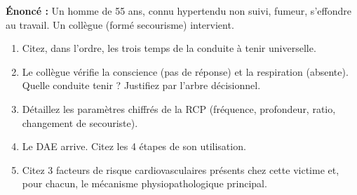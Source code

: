 \documentclass[11pt]{article}
\begin{document}
\begin{exercice}
\textbf{Énoncé :} Un homme de 55 ans, connu hypertendu non suivi, fumeur, s'effondre au travail. Un collègue (formé secourisme) intervient.
\begin{enumerate}
    \item Citez, dans l'ordre, les trois temps de la conduite à tenir universelle.
    \item Le collègue vérifie la conscience (pas de réponse) et la respiration (absente). Quelle conduite tenir ? Justifiez par l'arbre décisionnel.
    \item Détaillez les paramètres chiffrés de la RCP (fréquence, profondeur, ratio, changement de secouriste).
    \item Le DAE arrive. Citez les 4 étapes de son utilisation.
    \item Citez 3 facteurs de risque cardiovasculaires présents chez cette victime et, pour chacun, le mécanisme physiopathologique principal.
\end{enumerate}
\end{exercice}
\end{document}
